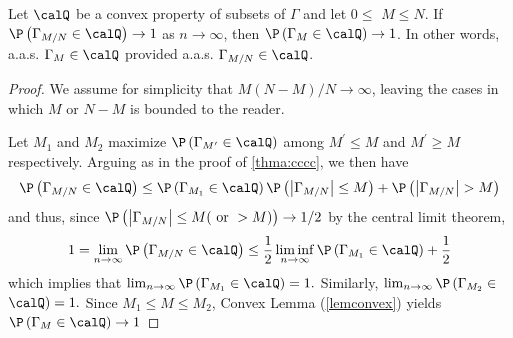 \documentclass{article}
\begin{document}
\begin{thma}\label{thma:sim}
 Let $\calQ$ be a convex property of subsets of $\Gamma$ and let $0 \leq$ $M \leq N .$ If $\P \left(\Gamma_{M / N} \in \calQ \right) \rightarrow 1$ as $n \rightarrow \infty$, then $\P \left(\Gamma_{M} \in \calQ \right) \rightarrow 1$. In other words, a.a.s. $\Gamma_{M} \in \calQ$ provided a.a.s. $\Gamma_{M / N} \in \calQ$.
\end{thma}
\begin{proof}
We assume for simplicity that $M(N-M) / N \rightarrow \infty$, leaving the cases in which $M$ or $N-M$ is bounded to the reader.

Let $M_{1}$ and $M_{2}$ maximize $\P \left(\Gamma_{M'} \in \calQ \right)$ among $M^{\prime} \leq M$ and $M^{\prime} \geq M$ respectively. Arguing as in the proof of \cref{thma:cccc}, we then have
\begin{align*}
\P \left(\Gamma_{M / N} \in \calQ \right) \leq \P \left(\Gamma_{M_{1}} \in \calQ \right) \P \left(\left|\Gamma_{M / N}\right| \leq M\right)+ \P \left(\left|\Gamma_{M / N}\right|>M\right)
\end{align*}
and thus, since $\P \left(\left|\Gamma_{M / N}\right| \leq M (\text { or }>M)\right) \rightarrow 1 / 2$ by the central limit theorem,
\begin{align*}
1=\lim _{n \rightarrow \infty} \P \left(\Gamma_{M / N} \in \calQ \right) \leq \frac{1}{2} \liminf _{n \rightarrow \infty} \P \left(\Gamma_{M_{1}} \in \calQ \right)+\frac{1}{2}
\end{align*}
which implies that $\lim _{n \rightarrow \infty} \P \left(\Gamma_{M_{1}} \in \calQ \right)=1 .$ Similarly, $\lim _{n \rightarrow \infty} \P \left(\Gamma_{M_{2}} \in\right.$
$\calQ )=1 .$ Since $M_{1} \leq M \leq M_{2}$, Convex Lemma (\cref{lemconvex}) yields $\P \left(\Gamma_{M} \in \calQ \right) \rightarrow 1$
\end{proof}
\end{document}
